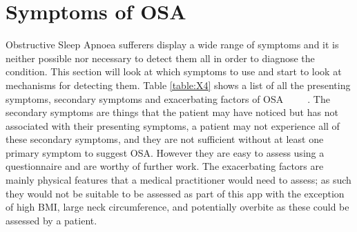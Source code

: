 \section{Symptoms of OSA}
\label{sec:signsAndSymptoms-sophie}
Obstructive Sleep Apnoea sufferers display a wide range of symptoms and it is neither possible nor necessary to detect them all in order to diagnose the condition. This section will look at which symptoms to use and start to look at mechanisms for detecting them. Table \ref{table:X4} shows a list of all the presenting symptoms, secondary symptoms and exacerbating factors of OSA ~\cite{epstein2009clinical} ~\cite{nhsmap} ~\cite{american2001international}. The secondary symptoms are things that the patient may have noticed but has not associated with their presenting symptoms, a patient may not experience all of these secondary symptoms, and they are not sufficient without at least one primary symptom to suggest OSA. However they are easy to assess using a questionnaire and are worthy of further work. The exacerbating factors are mainly physical features that a medical practitioner would need to assess; as such they would not be suitable to be assessed as part of this app with the exception of high BMI, large neck circumference, and potentially overbite as these could be assessed by a patient.

